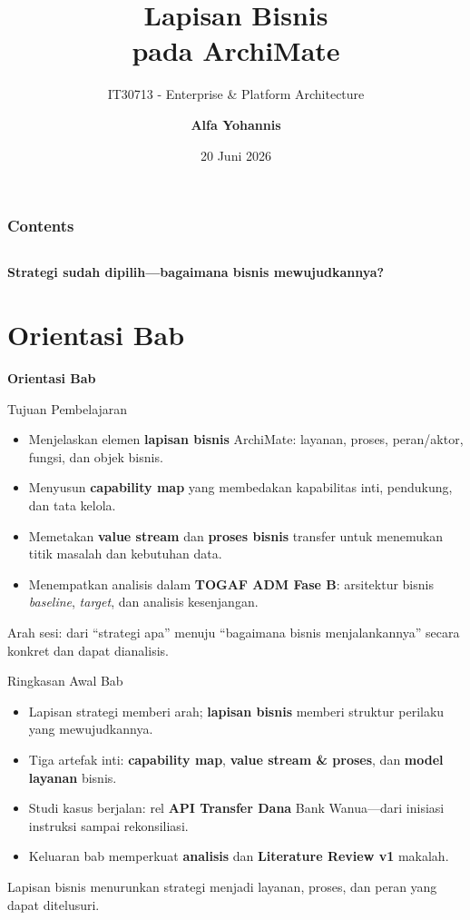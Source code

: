 \documentclass[aspectratio=169, table]{beamer}
\title{\huge Lapisan Bisnis\\
  \vspace{8pt}
  pada ArchiMate}
\subtitle{IT30713 - Enterprise \& Platform Architecture}
\author{\textbf{Alfa Yohannis}}
\date{20 Juni 2026}
\newcommand{\sectionframe}[1]{%
  \begin{frame}{\hfill}
    \centering
    \Huge{\textbf{#1}}
  \end{frame}
}
\newcommand{\takeaway}[1]{%
  \vspace{4pt}
  {\footnotesize #1}
}
\begin{document}
\frame{\titlepage}

\begin{frame}[fragile]
  \frametitle{Contents}
  \vspace{20pt}
  \begin{columns}[t]
    \tableofcontents[sections={1-4}]

    \tableofcontents[sections={5-8}]
  \end{columns}
\end{frame}

\begin{frame}{\hfill}
  \centering
  \Huge{\textbf{Strategi sudah dipilih---bagaimana bisnis mewujudkannya?}}
\end{frame}

\section{Orientasi Bab}
\sectionframe{Orientasi Bab}

\begin{frame}{Tujuan Pembelajaran}
  \vspace{6pt}
  \begin{itemize}
    \item Menjelaskan elemen \textbf{lapisan bisnis} ArchiMate: layanan, proses,
          peran/aktor, fungsi, dan objek bisnis.
    \item Menyusun \textbf{capability map} yang membedakan kapabilitas inti,
          pendukung, dan tata kelola.
    \item Memetakan \textbf{value stream} dan \textbf{proses bisnis} transfer
          untuk menemukan titik masalah dan kebutuhan data.
    \item Menempatkan analisis dalam \textbf{TOGAF ADM Fase B}: arsitektur bisnis
          \emph{baseline}, \emph{target}, dan analisis kesenjangan.
  \end{itemize}
  \takeaway{Arah sesi: dari ``strategi apa'' menuju ``bagaimana bisnis
  menjalankannya'' secara konkret dan dapat dianalisis.}
\end{frame}

\begin{frame}{Ringkasan Awal Bab}
  \vspace{6pt}
  \begin{itemize}
    \item Lapisan strategi memberi arah; \textbf{lapisan bisnis} memberi
          struktur perilaku yang mewujudkannya.
    \item Tiga artefak inti: \textbf{capability map}, \textbf{value stream \&
          proses}, dan \textbf{model layanan} bisnis.
    \item Studi kasus berjalan: rel \textbf{API Transfer Dana} Bank Wanua---dari
          inisiasi instruksi sampai rekonsiliasi.
    \item Keluaran bab memperkuat \textbf{analisis} dan \textbf{Literature Review
          v1} makalah.
  \end{itemize}
  \takeaway{Lapisan bisnis menurunkan strategi menjadi layanan, proses, dan peran
  yang dapat ditelusuri.}
\end{frame}
\end{document}
